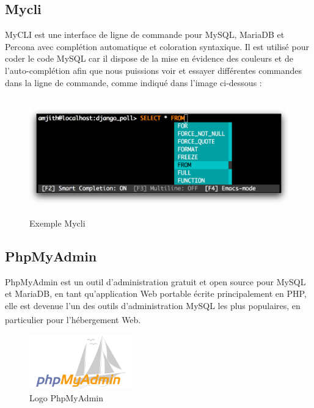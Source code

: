 \documentclass[12pt]{report}
\begin{document}
\newpage

\subsection{Mycli}

MyCLI est une interface de ligne de commande pour MySQL, MariaDB et Percona avec complétion automatique et coloration syntaxique. Il est utilisé pour coder le code MySQL car il dispose de la mise en évidence des couleurs et de l'auto-complétion afin que nous puissions voir et essayer différentes commandes dans la ligne de commande, comme indiqué dans l'image ci-dessous :

\begin{figure}[h]
\centering
    \includegraphics[width = 5in, height = 2in]{../Images/mycli.png}
\vspace{-0.2in}
\caption{Exemple Mycli}
\end{figure}

\vspace*{-0.1in}

\subsection{PhpMyAdmin}

PhpMyAdmin est un outil d'administration gratuit et open source pour MySQL et MariaDB, en tant qu'application Web portable écrite principalement en PHP, elle est devenue l'un des outils d'administration MySQL les plus populaires, en particulier pour l'hébergement Web.\textsuperscript{\cite{prettyman2016learn}\cite{supaartagorn2011php}\cite{converse2004php5}}

\begin{figure}[h]
\centering
    \includegraphics[width = 1.76in, height = 0.94in]{../Images/PhpMyAdmin.png}
\caption{Logo PhpMyAdmin}
\end{figure}
\end{document}
